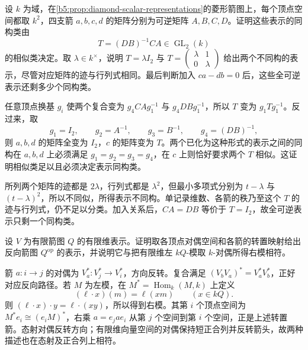 \begin{exercise}\label{b5:ex:09-square-change-basis}
	设 \(k\) 为域，在\cref{b5:prop:diamond-scalar-representations}的菱形箭图上，每个顶点空间都取 \(k^2\)，四支箭 \(a,b,c,d\) 的矩阵分别为可逆矩阵 \(A,B,C,D\)。证明这些表示的同构类由
	\[
		T=(DB)^{-1}CA\in\operatorname{GL}_2(k)
	\]
	的相似类决定。取 \(\lambda\in k^\times\)，说明 \(T=\lambda I_2\) 与
	\(T=\left(\begin{smallmatrix}\lambda&1\\0&\lambda\end{smallmatrix}\right)\)
	给出两个不同构的表示，尽管对应矩阵的迹与行列式相同。最后判断加入 \(ca-db=0\) 后，这些全可逆表示还剩多少个同构类。
\end{exercise}
\begin{solution}
	任意顶点换基 \(g_i\) 使两个复合变为 \(g_4CAg_1^{-1}\) 与 \(g_4DBg_1^{-1}\)，所以 \(T\) 变为 \(g_1Tg_1^{-1}\)。反过来，取
	\[
		g_1=I_2,\qquad g_2=A^{-1},\qquad g_3=B^{-1},\qquad g_4=(DB)^{-1},
	\]
	则 \(a,b,d\) 的矩阵全变为 \(I_2\)，\(c\) 的矩阵变为 \(T\)。两个已化为这种形式的表示之间的同构在 \(a,b,d\) 上必须满足 \(g_1=g_2=g_3=g_4\)，在 \(c\) 上则恰好要求两个 \(T\) 相似。这证明相似类足以且必须决定表示同构类。

	所列两个矩阵的迹都是 \(2\lambda\)，行列式都是 \(\lambda^2\)，但最小多项式分别为 \(t-\lambda\) 与 \((t-\lambda)^2\)，所以不同似，所得表示不同构。单记录维数、各箭的秩乃至这个 \(T\) 的迹与行列式，仍不足以分类。加入关系后，\(CA=DB\) 等价于 \(T=I_2\)，故全可逆表示只剩一个同构类。
\end{solution}

\begin{exercise}\label{b5:ex:09-dual-opposite-quiver}
	设 \(V\) 为有限箭图 \(Q\) 的有限维表示。证明取各顶点对偶空间和各箭的转置映射给出反向箭图 \(Q^{\mathrm{op}}\) 的表示，并说明它与把有限维左 \(kQ\)-模取 \(k\)-对偶所得右模相符。
\end{exercise}
\begin{solution}
	箭 \(a:i\to j\) 的对偶为 \(V_a^*:V_j^*\to V_i^*\)，方向反转。复合满足 \((V_bV_a)^*=V_a^*V_b^*\)，正好对应反向路径。若 \(M\) 为左模，在 \(M^*=\operatorname{Hom}_k(M,k)\) 上定义
	\[
		(\ell\cdot x)(m)=\ell(xm)\qquad(x\in kQ).
	\]
	则 \((\ell\cdot x)\cdot y=\ell\cdot(xy)\)，所以得到右模。其第 \(i\) 个顶点空间为 \(M^*e_i\cong(e_iM)^*\)，右乘 \(a=e_jae_i\) 从第 \(j\) 个空间到第 \(i\) 个空间，正是上述转置箭。态射对偶反转方向；有限维向量空间的对偶保持短正合列并反转箭头，故两种描述也在态射及正合列上相符。
\end{solution}

